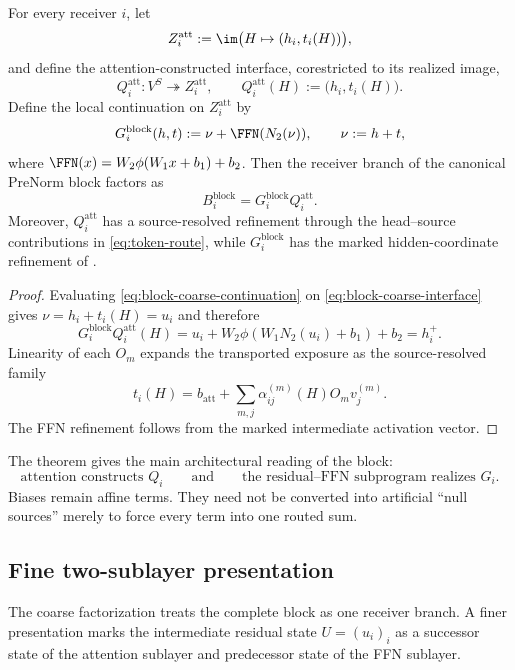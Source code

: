 \begin{theorem}\label{thm:block-receiver-factorization}
For every receiver $i$, let
\[
Z_i^{\mathrm{att}}
:=
\im\bigl(H\mapsto(h_i,t_i(H))\bigr),
\]
and define the attention-constructed interface, corestricted to its realized image,
\begin{equation}\label{eq:block-coarse-interface}
Q_i^{\mathrm{att}}:V^S\twoheadrightarrow Z_i^{\mathrm{att}},
\qquad
Q_i^{\mathrm{att}}(H):=\bigl(h_i,t_i(H)\bigr).
\end{equation}
Define the local continuation on $Z_i^{\mathrm{att}}$ by
\begin{equation}\label{eq:block-coarse-continuation}
G_i^{\mathrm{block}}(h,t)
:=\nu+\FFN(N_2(\nu)),
\qquad
\nu:=h+t,
\end{equation}
where $\FFN(x)=W_2\phi(W_1x+b_1)+b_2$. Then the receiver branch of the canonical PreNorm block factors as
\[
\boxed{
B_i^{\mathrm{block}}
=
G_i^{\mathrm{block}}Q_i^{\mathrm{att}}.
}
\]
Moreover, $Q_i^{\mathrm{att}}$ has a source-resolved refinement through the head--source contributions in \eqref{eq:token-route}, while $G_i^{\mathrm{block}}$ has the marked hidden-coordinate refinement of .
\end{theorem}

\begin{proof}
Evaluating \eqref{eq:block-coarse-continuation} on \eqref{eq:block-coarse-interface} gives $\nu=h_i+t_i(H)=u_i$ and therefore
\[
G_i^{\mathrm{block}}Q_i^{\mathrm{att}}(H)
=u_i+W_2\phi(W_1N_2(u_i)+b_1)+b_2
=h_i^+.
\]
Linearity of each $O_m$ expands the transported exposure as the source-resolved family
\[
t_i(H)
=b_{\mathrm{att}}
+
\sum_{m,j}\alpha_{ij}^{(m)}(H)O_mv_j^{(m)}.
\]
The FFN refinement follows from the marked intermediate activation vector.
\end{proof}

The theorem gives the main architectural reading of the block:
\[
\boxed{
\text{attention constructs }Q_i
\qquad\text{and}\qquad
\text{the residual--FFN subprogram realizes }G_i.
}
\]
Biases remain affine terms. They need not be converted into artificial ``null sources'' merely to force every term into one routed sum.

\subsection{Fine two-sublayer presentation}

The coarse factorization treats the complete block as one receiver branch. A finer presentation marks the intermediate residual state $U=(u_i)_i$ as a successor state of the attention sublayer and predecessor state of the FFN sublayer.

